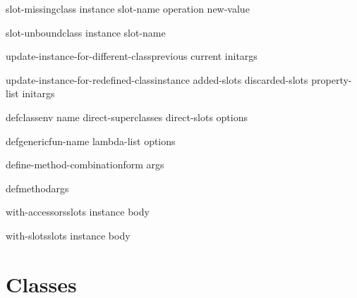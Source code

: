 \documentclass[10pt,english]{book}
\begin{document}
\begin{generic}{slot-missing}{class instance slot-name operation \op new-value}
  
\end{generic}

\begin{generic}{slot-unbound}{class instance slot-name}
  
\end{generic}

\begin{generic}{update-instance-for-different-class}{previous current \rest initargs}
  
\end{generic}

\begin{generic}{update-instance-for-redefined-class}{instance added-slots discarded-slots property-list \rest initargs}
  
\end{generic}

\begin{macro}{defclass}{\env env name direct-superclasses direct-slots \rest options}
  
\end{macro}

\begin{macro}{defgeneric}{fun-name lambda-list \body options}
  
\end{macro}

\begin{macro}{define-method-combination}{\whole form \rest args}
  
\end{macro}

\begin{macro}{defmethod}{\rest args}
  
\end{macro}

\begin{macro}{with-accessors}{slots instance \body body}
  
\end{macro}

\begin{macro}{with-slots}{slots instance \body body}
  
\end{macro}

\section{Classes}
\end{document}

